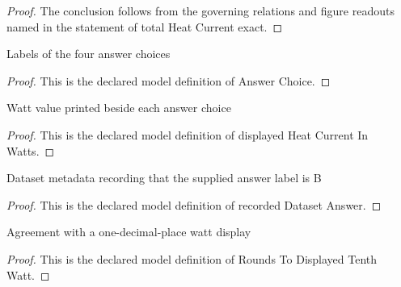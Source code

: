 \begin{proof}
  The conclusion follows from the governing relations and figure readouts named in the statement of total Heat Current exact.
\end{proof}
\begin{definition}
  \label{def:physics:phyx-mini-0468:phyxminiproblems-problemphyxmini0468-answerchoice}
  Labels of the four answer choices
\end{definition}
\begin{proof}
  This is the declared model definition of Answer Choice.
\end{proof}
\begin{definition}
  \label{def:physics:phyx-mini-0468:phyxminiproblems-problemphyxmini0468-displayedheatcurrentinwatts}
  Watt value printed beside each answer choice
\end{definition}
\begin{proof}
  This is the declared model definition of displayed Heat Current In Watts.
\end{proof}
\begin{definition}
  \label{def:physics:phyx-mini-0468:phyxminiproblems-problemphyxmini0468-recordeddatasetanswer}
  Dataset metadata recording that the supplied answer label is B
\end{definition}
\begin{proof}
  This is the declared model definition of recorded Dataset Answer.
\end{proof}
\begin{definition}
  \label{def:physics:phyx-mini-0468:phyxminiproblems-problemphyxmini0468-roundstodisplayedtenthwatt}
  Agreement with a one-decimal-place watt display
\end{definition}
\begin{proof}
  This is the declared model definition of Rounds To Displayed Tenth Watt.
\end{proof}
